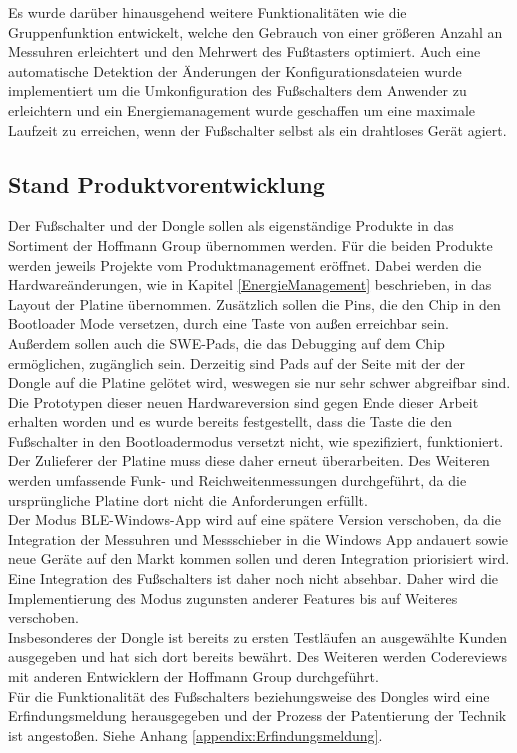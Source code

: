 Es wurde darüber hinausgehend weitere Funktionalitäten wie die Gruppenfunktion entwickelt, welche den Gebrauch von einer größeren Anzahl an Messuhren erleichtert und den Mehrwert des Fußtasters optimiert. Auch eine automatische Detektion der Änderungen der Konfigurationsdateien wurde implementiert um die Umkonfiguration des Fußschalters dem Anwender zu erleichtern und ein Energiemanagement wurde geschaffen um eine maximale Laufzeit zu erreichen, wenn der Fußschalter selbst als ein drahtloses Gerät agiert.\\


\subsection{Stand Produktvorentwicklung}
Der Fußschalter und der Dongle sollen als eigenständige Produkte in das Sortiment der Hoffmann Group übernommen werden. Für die beiden Produkte werden jeweils Projekte vom Produktmanagement eröffnet. Dabei werden die Hardwareänderungen, wie in Kapitel \ref{EnergieManagement} beschrieben, in das Layout der Platine übernommen. Zusätzlich sollen die Pins, die den Chip in den Bootloader Mode versetzen, durch eine Taste von außen erreichbar sein. Außerdem sollen auch die SWE-Pads, die das Debugging auf dem Chip ermöglichen, zugänglich sein. Derzeitig sind Pads auf der Seite mit der der Dongle auf die Platine gelötet wird, weswegen sie nur sehr schwer abgreifbar sind. Die Prototypen dieser neuen Hardwareversion sind gegen Ende dieser Arbeit erhalten worden und es wurde bereits festgestellt, dass die Taste die den Fußschalter in den Bootloadermodus versetzt nicht, wie spezifiziert, funktioniert. Der Zulieferer der Platine muss diese daher erneut überarbeiten. Des Weiteren werden umfassende Funk- und Reichweitenmessungen durchgeführt, da die ursprüngliche Platine dort nicht die Anforderungen erfüllt.\\
Der Modus \ac{BLE}-Windows-App wird auf eine spätere Version verschoben, da die Integration der Messuhren und Messschieber in die Windows App andauert sowie neue Geräte auf den Markt kommen sollen und deren Integration priorisiert wird. Eine Integration des Fußschalters ist daher noch nicht absehbar. Daher wird die Implementierung des Modus zugunsten anderer Features bis auf Weiteres verschoben.\\
Insbesonderes der Dongle ist bereits zu ersten Testläufen an ausgewählte Kunden ausgegeben und hat sich dort bereits bewährt. Des Weiteren werden Codereviews mit anderen Entwicklern der Hoffmann Group durchgeführt.\\
Für die Funktionalität des Fußschalters beziehungsweise des Dongles wird eine Erfindungsmeldung herausgegeben und der Prozess der Patentierung der Technik ist angestoßen. Siehe Anhang \ref{appendix:Erfindungsmeldung}.
